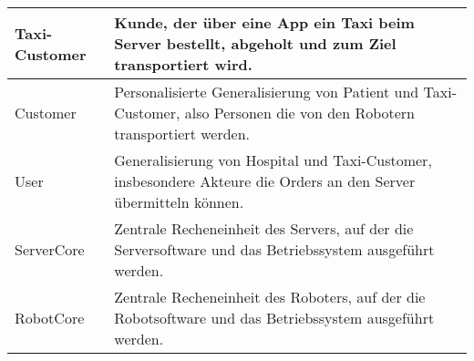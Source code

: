 \begin{tabularx}{\textwidth}{|l|X|}
		Taxi-Customer & Kunde, der über eine App ein Taxi beim Server bestellt, abgeholt und zum Ziel transportiert wird.\\ \hline
		Customer & Personalisierte Generalisierung von Patient und Taxi-Customer, also Personen die von den Robotern transportiert werden.\\ \hline
		User & Generalisierung von Hospital und Taxi-Customer, insbesondere Akteure die Orders an den Server übermitteln können.\\ \hline
		ServerCore & Zentrale Recheneinheit des Servers, auf der die Serversoftware und das Betriebssystem ausgeführt werden.\\ \hline
		RobotCore & Zentrale Recheneinheit des Roboters, auf der die Robotsoftware und das Betriebssystem ausgeführt werden.\\ \hline
	\end{tabularx}
